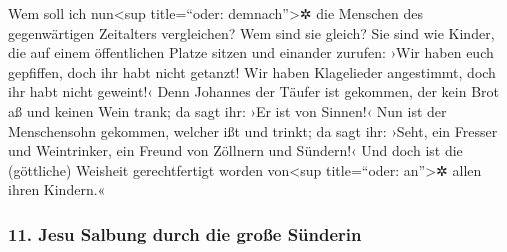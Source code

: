  Wem soll ich nun\textless sup title=``oder:
demnach''\textgreater✲ die Menschen des gegenwärtigen Zeitalters
vergleichen? Wem sind sie gleich?  Sie sind wie Kinder,
die auf einem öffentlichen Platze sitzen und einander zurufen: ›Wir
haben euch gepfiffen, doch ihr habt nicht getanzt! Wir haben Klagelieder
angestimmt, doch ihr habt nicht geweint!‹  Denn Johannes
der Täufer ist gekommen, der kein Brot aß und keinen Wein trank; da sagt
ihr: ›Er ist von Sinnen!‹  Nun ist der Menschensohn
gekommen, welcher ißt und trinkt; da sagt ihr: ›Seht, ein Fresser und
Weintrinker, ein Freund von Zöllnern und Sündern!‹  Und
doch ist die (göttliche) Weisheit gerechtfertigt worden von\textless sup
title=``oder: an''\textgreater✲ allen ihren Kindern.«

\hypertarget{jesu-salbung-durch-die-grouxdfe-suxfcnderin}{%
\subsubsection{11. Jesu Salbung durch die große
Sünderin}\label{jesu-salbung-durch-die-grouxdfe-suxfcnderin}}

